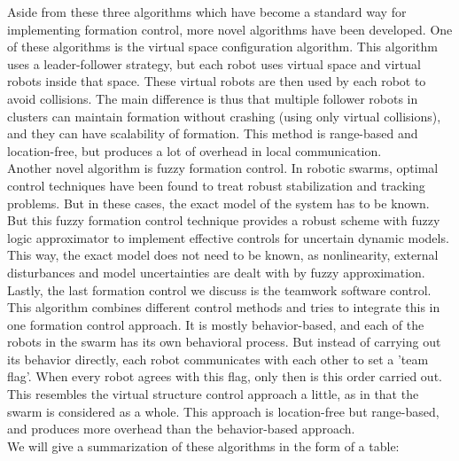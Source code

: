 Aside from these three algorithms which have become a standard way for implementing formation control, more novel algorithms have been developed. 
One of these algorithms is the virtual space configuration algorithm. \cite{Wee}
This algorithm uses a leader-follower strategy, but each robot uses virtual space and virtual robots inside that space.
These virtual robots are then used by each robot to avoid collisions. 
The main difference is thus that multiple follower robots in clusters can maintain formation without crashing (using only virtual collisions), and they can have scalability of formation. 
This method is range-based and location-free, but produces a lot of overhead in local communication.\\ 

Another novel algorithm is fuzzy formation control.\cite{Ranjbar-Sahraei}
In robotic swarms, optimal control techniques have been found to treat robust stabilization and tracking problems. 
But in these cases, the exact model of the system has to be known. 
But this fuzzy formation control technique provides a robust scheme with fuzzy logic approximator to implement effective controls for uncertain dynamic models.
This way, the exact model does not need to be known, as nonlinearity, external disturbances and model uncertainties are dealt with by fuzzy approximation. \\

Lastly, the last formation control we discuss is the teamwork software control. \cite{Kaminka}
This algorithm combines different control methods and tries to integrate this in one formation control approach.
It is mostly behavior-based, and each of the robots in the swarm has its own behavioral process. 
But instead of carrying out its behavior directly, each robot communicates with each other to set a 'team flag'. 
When every robot agrees with this flag, only then is this order carried out. 
This resembles the virtual structure control approach a little, as in that the swarm is considered as a whole. 
This approach is location-free but range-based, and produces more overhead than the behavior-based approach. \\

We will give a summarization of these algorithms in the form of a table:

